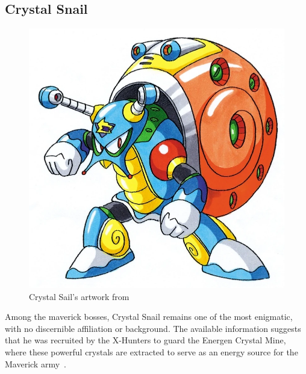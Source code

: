 \subsection{Crystal Snail}\label{boss:Crystal_snail}
\begin{figure}[htp]
	\centering
	\includegraphics[height=\portraitsize]{figures/X2/Crystal_snail/Crystal_Snail.png}
	\caption{Crystal Sail's artwork from \cite{book:MMX_Complete_art}}
\end{figure}
Among the maverick bosses, Crystal Snail remains one of the most enigmatic, with no discernible affiliation or background. The available information suggests that he was recruited by the X-Hunters to guard the Energen Crystal Mine, where these powerful crystals are extracted to serve as an energy source for the Maverick army~\cite{wayback:X2_resources}.


